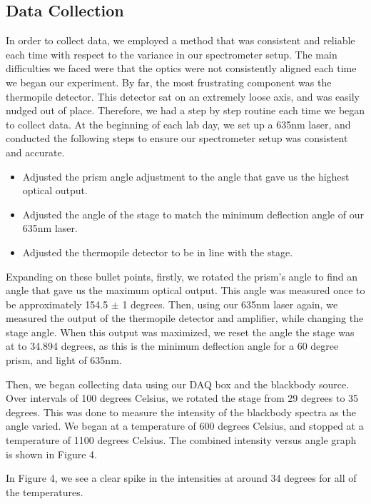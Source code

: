 \documentclass[10pt,letterpaper,onecolumn]{article}
\begin{document}
\subsection{Data Collection}

In order to collect data, we employed a method that was consistent
and reliable each time with respect to the variance in our spectrometer setup.
The main difficulties we faced were that the optics were not consistently
aligned each time we began our experiment. By far, the most frustrating 
component was the thermopile detector. This detector sat on an extremely loose 
axis, and was easily nudged out of place. Therefore, we had a step by step 
routine each time we began to collect data. At the beginning of each lab day,
we set up a 635nm laser, and conducted the following steps to ensure our 
spectrometer setup was consistent and accurate.
\begin{itemize}
  \item Adjusted the prism angle adjustment to the angle that gave us the highest optical output.
  \item Adjusted the angle of the stage to match the minimum deflection angle of our 635nm laser.
  \item Adjusted the thermopile detector to be in line with the stage.
\end{itemize}

Expanding on these bullet points, firstly, we rotated the prism's angle to find
an angle that gave us the maximum optical output. This angle was measured once
to be approximately 154.5 $\pm$ 1 degrees. Then, using our 635nm laser again, we 
measured the output of the thermopile detector and amplifier, while changing the
stage angle. When this output was maximized, we reset the angle the stage was at
to 34.894 degrees, as this is the minimum deflection angle for a 60 degree prism, 
and light of 635nm.

Then, we began collecting data using our DAQ box and the blackbody source. 
Over intervals of 100 degrees Celsius, we rotated the stage from 29 degrees 
to 35 degrees. This was done to measure the intensity of the blackbody spectra
as the angle varied. We began at a temperature of 600 degrees Celsius, and stopped
at a temperature of 1100 degrees Celsius. The combined intensity versus angle graph
is shown in Figure 4. 

In Figure 4, we see a clear spike in the intensities at around 34 degrees for
all of the temperatures.
\end{document}
